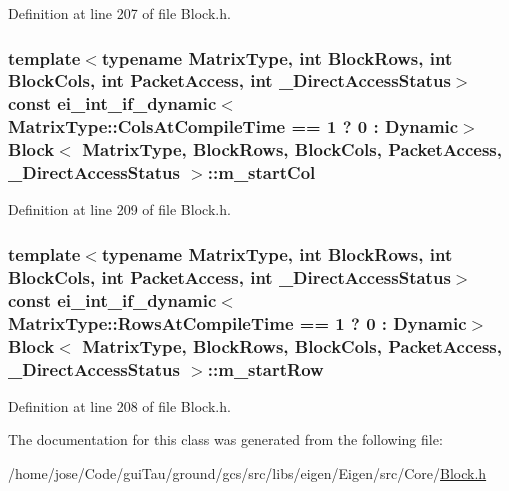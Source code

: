 Definition at line 207 of file Block.\-h.

\hypertarget{class_block_a272790377a35387e424f99323fd226f4}{
\subsubsection[{m\-\_\-start\-Col}]{\setlength{\rightskip}{0pt plus 5cm}template$<$typename Matrix\-Type, int Block\-Rows, int Block\-Cols, int Packet\-Access, int \-\_\-\-Direct\-Access\-Status$>$ const ei\-\_\-int\-\_\-if\-\_\-dynamic$<$Matrix\-Type\-::\-Cols\-At\-Compile\-Time == 1 ? 0 \-: {\bf Dynamic}$>$ {\bf Block}$<$ Matrix\-Type, Block\-Rows, Block\-Cols, Packet\-Access, \-\_\-\-Direct\-Access\-Status $>$\-::m\-\_\-start\-Col\hspace{0.3cm}{\ttfamily [protected]}}}\label{class_block_a272790377a35387e424f99323fd226f4}


Definition at line 209 of file Block.\-h.

\hypertarget{class_block_a4ecc465fc0b668b4e26c4d946a3b2c8b}{
\subsubsection[{m\-\_\-start\-Row}]{\setlength{\rightskip}{0pt plus 5cm}template$<$typename Matrix\-Type, int Block\-Rows, int Block\-Cols, int Packet\-Access, int \-\_\-\-Direct\-Access\-Status$>$ const ei\-\_\-int\-\_\-if\-\_\-dynamic$<$Matrix\-Type\-::\-Rows\-At\-Compile\-Time == 1 ? 0 \-: {\bf Dynamic}$>$ {\bf Block}$<$ Matrix\-Type, Block\-Rows, Block\-Cols, Packet\-Access, \-\_\-\-Direct\-Access\-Status $>$\-::m\-\_\-start\-Row\hspace{0.3cm}{\ttfamily [protected]}}}\label{class_block_a4ecc465fc0b668b4e26c4d946a3b2c8b}


Definition at line 208 of file Block.\-h.



The documentation for this class was generated from the following file\-:\begin{DoxyCompactItemize}
\item 
/home/jose/\-Code/gui\-Tau/ground/gcs/src/libs/eigen/\-Eigen/src/\-Core/\hyperlink{_block_8h}{Block.\-h}\end{DoxyCompactItemize}
